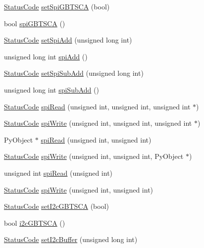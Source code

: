 \begin{DoxyCompactItemize}
\item 
\hyperlink{classStatusCode}{Status\+Code} \hyperlink{classFePGA_a59b840619341df26918a6c26e8b8e72b}{set\+Spi\+G\+B\+T\+S\+CA} (bool)
\item 
bool \hyperlink{classFePGA_ad305543bda4d68fe181cd7fa614b2fe1}{spi\+G\+B\+T\+S\+CA} ()
\item 
\hyperlink{classStatusCode}{Status\+Code} \hyperlink{classFePGA_a2cd235d1971625d6742d4f3107489a07}{set\+Spi\+Add} (unsigned long int)
\item 
unsigned long int \hyperlink{classFePGA_a721de3fa12e207392cd6156027d2c776}{spi\+Add} ()
\item 
\hyperlink{classStatusCode}{Status\+Code} \hyperlink{classFePGA_ad0a662adc6070427f0e1962c20a92de6}{set\+Spi\+Sub\+Add} (unsigned long int)
\item 
unsigned long int \hyperlink{classFePGA_a6637adb1cd981cf398ea9f1c3feafe83}{spi\+Sub\+Add} ()
\item 
\hyperlink{classStatusCode}{Status\+Code} \hyperlink{classFePGA_a637b93fed75b576a54e723acb36cb6a3}{spi\+Read} (unsigned int, unsigned int, unsigned int $\ast$)
\item 
\hyperlink{classStatusCode}{Status\+Code} \hyperlink{classFePGA_ac3e8b10fc267b44fef1e651cab77d2ab}{spi\+Write} (unsigned int, unsigned int, unsigned int $\ast$)
\item 
Py\+Object $\ast$ \hyperlink{classFePGA_a41fb676237f8906ec5a0c1b9084ad33e}{spi\+Read} (unsigned int, unsigned int)
\item 
\hyperlink{classStatusCode}{Status\+Code} \hyperlink{classFePGA_aa6aebdd1ccb236f9009a29243f3c7c2b}{spi\+Write} (unsigned int, unsigned int, Py\+Object $\ast$)
\item 
unsigned int \hyperlink{classFePGA_a165f5b70ad30af106ecf9a3ace71d4eb}{spi\+Read} (unsigned int)
\item 
\hyperlink{classStatusCode}{Status\+Code} \hyperlink{classFePGA_ab41df6b1d6a147fbf5611e54058f902d}{spi\+Write} (unsigned int, unsigned int)
\item 
\hyperlink{classStatusCode}{Status\+Code} \hyperlink{classFePGA_ac9a16de5f01fda901494abe61efb5029}{set\+I2c\+G\+B\+T\+S\+CA} (bool)
\item 
bool \hyperlink{classFePGA_a210cf57766c4f818ea61af671e91cfeb}{i2c\+G\+B\+T\+S\+CA} ()
\item 
\hyperlink{classStatusCode}{Status\+Code} \hyperlink{classFePGA_aaf52ed549f6b79d53f49c3f85c5fbad2}{set\+I2c\+Buffer} (unsigned long int)
\item 

\end{DoxyCompactItemize}
